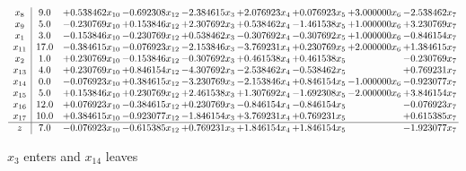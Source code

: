 \documentclass[10pt]{article}
\begin{document}
 \[\begin{array}{c| c c@{\hskip 2pt} c@{\hskip 2pt} c@{\hskip 2pt} c@{\hskip 2pt} c@{\hskip 2pt} c@{\hskip 2pt} c@{\hskip 2pt} }
 x_{8}   &  9.0 & + 0.538462 x_{10} & -0.692308 x_{12} & -2.384615 x_{3} & + 2.076923 x_{4} & + 0.076923 x_{5} & + 3.000000 x_{6} & -2.538462 x_{7}\\
 x_{9}   &  5.0 & -0.230769 x_{10} & + 0.153846 x_{12} & + 2.307692 x_{3} & + 0.538462 x_{4} & -1.461538 x_{5} & + 1.000000 x_{6} & + 3.230769 x_{7}\\
 x_{1}   &  3.0 & -0.153846 x_{10} & -0.230769 x_{12} & + 0.538462 x_{3} & -0.307692 x_{4} & -0.307692 x_{5} & + 1.000000 x_{6} & -0.846154 x_{7}\\
 x_{11}   &  17.0 & -0.384615 x_{10} & -0.076923 x_{12} & -2.153846 x_{3} & -3.769231 x_{4} & + 0.230769 x_{5} & + 2.000000 x_{6} & + 1.384615 x_{7}\\
 x_{2}   &  1.0 & + 0.230769 x_{10} & -0.153846 x_{12} & -0.307692 x_{3} & + 0.461538 x_{4} & + 0.461538 x_{5} &   & -0.230769 x_{7}\\
 x_{13}   &  4.0 & + 0.230769 x_{10} & + 0.846154 x_{12} & -4.307692 x_{3} & -2.538462 x_{4} & -0.538462 x_{5} &   & + 0.769231 x_{7}\\
 x_{14}   &  0.0 & -0.076923 x_{10} & + 0.384615 x_{12} & -3.230769 x_{3} & -2.153846 x_{4} & + 0.846154 x_{5} & -1.000000 x_{6} & -0.923077 x_{7}\\
 x_{15}   &  5.0 & + 0.153846 x_{10} & + 0.230769 x_{12} & + 2.461538 x_{3} & + 1.307692 x_{4} & -1.692308 x_{5} & -2.000000 x_{6} & + 3.846154 x_{7}\\
 x_{16}   &  12.0 & + 0.076923 x_{10} & -0.384615 x_{12} & + 0.230769 x_{3} & -0.846154 x_{4} & -0.846154 x_{5} &   & -0.076923 x_{7}\\
 x_{17}   &  10.0 & + 0.384615 x_{10} & -0.923077 x_{12} & -1.846154 x_{3} & + 3.769231 x_{4} & + 0.769231 x_{5} &   & + 0.615385 x_{7}\\
\hline
z    &  7.0 & -0.076923 x_{10} & -0.615385 x_{12} & + 0.769231 x_{3} & + 1.846154 x_{4} & + 1.846154 x_{5} &   & -1.923077 x_{7}\\
\end{array}\]


 $ x_{3} $ enters and $ x_{14} $ leaves 
\end{document}
